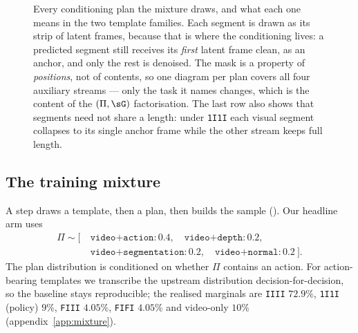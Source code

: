 \documentclass{article} %
\newcommand{\tmpl}[1]{\texttt{#1}}
\newcommand{\appref}[1]{appendix~\ref{#1}}
\newcommand{\gcell}[1]{\tikz[baseline=-0.35ex]{%
  \foreach \i/\c in {#1}{\fill[\c] ({\i*0.115},0) rectangle ({\i*0.115+0.115},0.17);
    \draw[line width=0.2pt] ({\i*0.115},0) rectangle ({\i*0.115+0.115},0.17);}}}
\newcommand{\anchF}{\gcell{0/givenfill,1/givenfill,2/givenfill,3/givenfill}}
\newcommand{\anchI}{\gcell{0/givenfill,1/predfill,2/predfill,3/predfill}}
\newcommand{\anchOne}{\gcell{0/givenfill}}
\begin{document}
\begin{figure}[t]
\begin{center}
{}
\end{center}
\caption{Every conditioning plan the mixture draws, and what each one means in the two template
families. Each segment is drawn as its strip of latent frames, because that is where the
conditioning lives: a predicted segment still receives its \emph{first} latent frame clean, as an
anchor, and only the rest is denoised. The mask is a property of \emph{positions}, not of
contents, so one diagram per plan covers all four auxiliary streams --- only the task it names
changes, which is the content of the $(\Pi,\sG)$ factorisation. The last row also shows that
segments need not share a length: under \texttt{1I1I} each visual segment collapses to its single
anchor frame while the other stream keeps full length.}
\label{fig:layout}
\end{figure}

\subsection{The training mixture}
\label{sec:mixture}

A step draws a template, then a plan, then builds the sample (). Our headline
arm uses
\begin{equation}
\begin{split}
\Pi \sim \big[\ &\tmpl{video+action}\!:\!0.4,\quad \tmpl{video+depth}\!:\!0.2,\\
                &\tmpl{video+segmentation}\!:\!0.2,\quad \tmpl{video+normal}\!:\!0.2\ \big].
\end{split}
\label{eq:mix}
\end{equation}
The plan distribution is conditioned on whether $\Pi$ contains an action. For action-bearing
templates we transcribe the upstream distribution decision-for-decision, so the baseline stays
reproducible; the realised marginals are \texttt{IIII} $72.9\%$, \texttt{1I1I} (policy) $9\%$,
\texttt{FIII} $4.05\%$, \texttt{FIFI} $4.05\%$ and video-only $10\%$ (\appref{app:mixture}).
\end{document}
